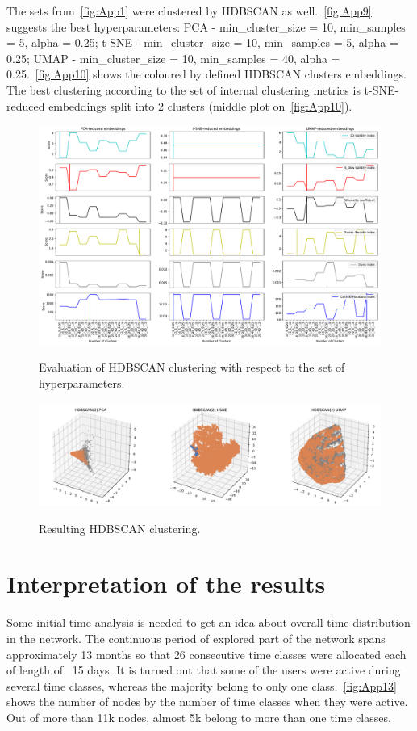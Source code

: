 The sets from~\autoref{fig:App1} were clustered by HDBSCAN as well.~\autoref{fig:App9} suggests the best hyperparameters: PCA - min\_cluster\_size = 10, min\_samples = 5, alpha = 0.25;
t-SNE - min\_cluster\_size = 10, min\_samples = 5, alpha = 0.25; UMAP - min\_cluster\_size = 10, min\_samples = 40, alpha = 0.25.~\autoref{fig:App10} shows the coloured by defined HDBSCAN clusters embeddings. The best clustering according to the set of internal clustering metrics is t-SNE-reduced embeddings split into 2 clusters (middle plot on~\autoref{fig:App10}).

\begin{figure}[!ht]
	\centering
	\includegraphics[width=1.0\textwidth]{images/appendix/App9.pdf}\\
	\caption{Evaluation of HDBSCAN clustering with respect to the set of hyperparameters.}
	\label{fig:App9}
\end{figure}
\begin{figure}[!ht]
	\centering
	\includegraphics[width=1.0\textwidth]{images/appendix/App10.pdf}\\
	\caption{Resulting HDBSCAN clustering.}
	\label{fig:App10}
\end{figure}

\section{Interpretation of the results}
Some initial time analysis is needed to get an idea about overall time distribution in the network. The continuous period of explored part of the network spans approximately 13 months so that 26 consecutive time classes were allocated each of length of ~15 days. It is turned out that some of the users were active during several time classes, whereas the majority belong to only one class.~\autoref{fig:App13} shows the number of nodes by the number of time classes when they were active. Out of more than 11k nodes, almost 5k belong to more than one time classes.

